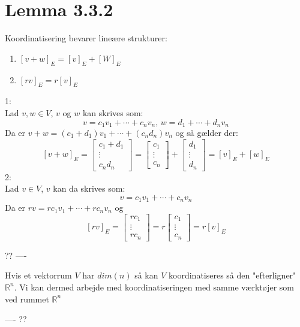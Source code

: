 \documentclass[a4paper,oneside,article]{memoir}
\begin{document}
	\section{Lemma 3.3.2}
	Koordinatisering bevarer lineære strukturer:
	\begin{enumerate}
	\item $[v+w]_E=[v]_E+[W]_E$
	\item $[rv]_E=r[v]_E$
	\end{enumerate}
	1:\\
	Lad $v,w\in V$, $v$ og $w$ kan skrives som:
	$$v=c_1v_1+\cdots+c_nv_n,\, w=d_1+\cdots+d_nv_n$$
	Da er $v+w=(c_1+d_1)v_1+\cdots+(c_nd_n)v_n$ og så gælder der:
	$$[v+w]_E=\begin{bmatrix}
	c_1+d_1\\
	\vdots\\
	c_nd_n
	\end{bmatrix}=\begin{bmatrix}
	c_1\\
	\vdots\\
	c_n
	\end{bmatrix}+\begin{bmatrix}
	d_1\\
	\vdots\\
	d_n
	\end{bmatrix}
	=[v]_E+[w]_E$$
	2:\\
	Lad $v\in V$, $v$ kan da skrives som:
	$$v=c_1v_1+\cdots+c_nv_n$$
	Da er $rv=rc_1v_1+\cdots+rc_nv_n$ og
	$$[rv]_E=\begin{bmatrix}
	rc_1\\
	\vdots\\
	rc_n
	\end{bmatrix}=r\begin{bmatrix}
	c_1\\
	\vdots\\
	c_n
	\end{bmatrix}
	=r[v]_E$$
	
	?? ----
	
	Hvis et vektorrum $V$ har $dim(n)$ så kan $V$ koordinatiseres
	så den "efterligner" $\mathbb{R}^n$. Vi kan dermed arbejde med
	koordinatiseringen med samme værktøjer som ved rummet 
	$\mathbb{R}^n$ 
	
	---- ??
    
\end{document}
